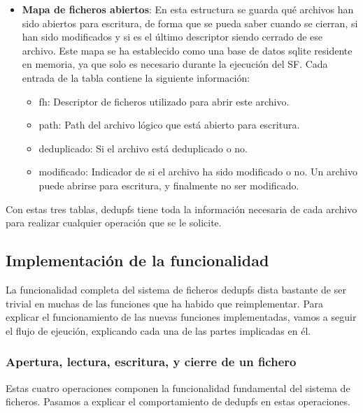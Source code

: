 \documentclass[12pt,a4paper]{article}
\begin{document}
\begin{itemize}
  \item \textbf{Mapa de ficheros abiertos}: En esta estructura se guarda qué archivos han sido abiertos para escritura, de forma que se pueda saber cuando se cierran, si han sido modificados y si es el último descriptor siendo cerrado de ese archivo. Este mapa se ha establecido como una base de datos sqlite residente en memoria, ya que solo es necesario durante la ejecución del SF. Cada entrada de la tabla contiene la siguiente información:
  \begin{itemize}
   \item fh: Descriptor de ficheros utilizado para abrir este archivo.
   \item path: Path del archivo lógico que está abierto para escritura.
   \item deduplicado: Si el archivo está deduplicado o no.
   \item modificado: Indicador de si el archivo ha sido modificado o no. Un archivo puede abrirse para escritura, y finalmente no ser modificado.
  \end{itemize}
\end{itemize}

Con estas tres tablas, dedupfs tiene toda la información necesaria de cada archivo para realizar cualquier operación que se le solicite.

\subsection{Implementación de la funcionalidad}

La funcionalidad completa del sistema de ficheros dedupfs dista bastante de ser trivial en muchas de las funciones que ha habido que reimplementar. Para explicar el funcionamiento de las nuevas funciones implementadas, vamos a seguir el flujo de ejeución, explicando cada una de las partes implicadas en él.

\subsubsection{Apertura, lectura, escritura, y cierre de un fichero}

Estas cuatro operaciones componen la funcionalidad fundamental del sistema de ficheros. Pasamos a explicar el comportamiento de dedupfs en estas operaciones.
\end{document}
